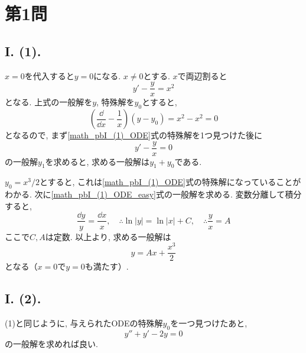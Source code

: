\section*{第1問}

\subsection*{I. (1).}
$x=0$を代入すると$y=0$になる. 
$x\neq 0$とする. 
$x$で両辺割ると
\begin{equation}
  y'-\frac{y}{x}=x^2\label{math_pbI_(1)_ODE}
\end{equation}
となる. 
上式の一般解を$y$, 特殊解を$y_0$とすると, 
\begin{equation}
  \left(\frac{\dd }{\dd x}-\frac{1}{x} \right)(y-y_0)=x^2-x^2=0
\end{equation}
となるので, まず\eqref{math_pbI_(1)_ODE}式の特殊解を1つ見つけた後に
\begin{equation}
  y'-\frac{y}{x}=0\label{math_pbI_(1)_ODE_easy}
\end{equation}
の一般解$y_1$を求めると, 求める一般解は$y_1+y_0$である. 

$y_0={x^3}/{2}$とすると, これは\eqref{math_pbI_(1)_ODE}式の特殊解になっていることがわかる. 
次に\eqref{math_pbI_(1)_ODE_easy}式の一般解を求める. 
変数分離して積分すると, 
\begin{equation}
  \frac{\dd y}{y}=\frac{\dd x}{x}, \quad\therefore \ln{|y|}=\ln{|x|}+C, \quad\therefore \frac{y}{x}=A
\end{equation}
ここで$C, A$は定数. 
以上より, 求める一般解は
\begin{equation}
  y=Ax+\frac{x^3}{2}
\end{equation}
となる（$x=0$で$y=0$も満たす）. 

\subsection*{I. (2).}
(1)と同じように, 与えられたODEの特殊解$y_0$を一つ見つけたあと, 
\begin{equation}
  y''+y'-2y=0\label{math_pbI_(2)_ODE_easy}
\end{equation}
の一般解を求めれば良い. 

